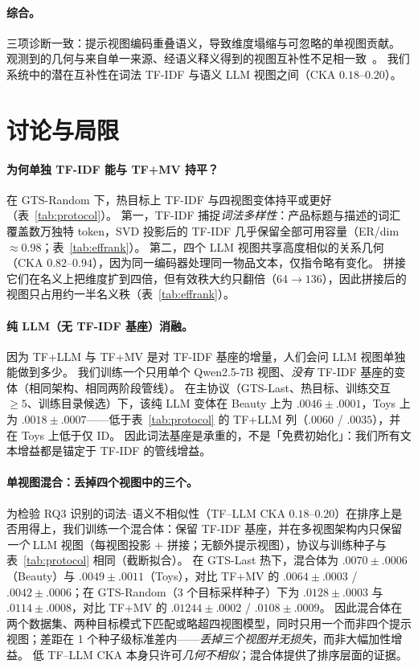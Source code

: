\documentclass[sigconf,natbib=true,anonymous]{acmart}
\newcommand{\tfidf}{\textsc{TF-IDF}\xspace}
\newcommand{\llm}{\textsc{LLM}\xspace}
\newcommand{\tfllm}{\textsc{TF+LLM}\xspace}
\newcommand{\tfmv}{\textsc{TF+MV}\xspace}
\begin{document}
\paragraph{综合。}
三项诊断一致：提示视图编码重叠语义，导致维度塌缩与可忽略的单视图贡献。
观测到的几何与来自单一来源、经语义释义得到的视图互补性不足相一致~\cite{xu2013multiview}。
我们系统中的潜在互补性在词法 \tfidf 与语义 \llm 视图之间（CKA $0.18$--$0.20$）。

\section{讨论与局限}
\label{sec:discussion}

\paragraph{为何单独 TF-IDF 能与 \tfmv 持平？}
在 GTS-Random 下，热目标上 \tfidf 与四视图变体持平或更好（表~\ref{tab:protocol}）。
第一，\tfidf 捕捉\emph{词法多样性}：产品标题与描述的词汇覆盖数万独特 token，SVD 投影后的 TF-IDF 几乎保留全部可用容量（ER/dim $\approx$0.98；表~\ref{tab:effrank}）。
第二，四个 LLM 视图共享高度相似的关系几何（CKA $0.82$--$0.94$），因为同一编码器处理同一物品文本，仅指令略有变化。
拼接它们在名义上把维度扩到四倍，但有效秩大约只翻倍（$64 \to 136$），因此拼接后的视图只占用约一半名义秩（表~\ref{tab:effrank}）。

\paragraph{纯 LLM（无 \tfidf 基座）消融。}
因为 \tfllm 与 \tfmv 是对 \tfidf 基座的增量，人们会问 LLM 视图单独能做到多少。
我们训练一个只用单个 Qwen2.5-7B 视图、\emph{没有} \tfidf 基座的变体（相同架构、相同两阶段管线）。
在主协议（GTS-Last、热目标、训练交互 $\ge 5$、训练目录候选）下，该纯 LLM 变体在 Beauty 上为 $.0046\pm.0001$，Toys 上为 $.0018\pm.0007$——低于表~\ref{tab:protocol} 的 \tfllm 列（$.0060$ / $.0035$），并在 Toys 上低于仅 ID。
因此词法基座是承重的，不是「免费初始化」：我们所有文本增益都是锚定于 \tfidf 的管线增益。

\paragraph{单视图混合：丢掉四个视图中的三个。}
为检验 RQ3 识别的词法--语义不相似性（TF--LLM CKA $0.18$--$0.20$）在排序上是否用得上，我们训练一个混合体：保留 \tfidf 基座，并在多视图架构内只保留\emph{一个} LLM 视图（每视图投影 + 拼接；无额外提示视图），协议与训练种子与表~\ref{tab:protocol} 相同（截断拟合）。
在 GTS-Last 热下，混合体为 $.0070\pm.0006$（Beauty）与 $.0049\pm.0011$（Toys），对比 \tfmv 的 $.0064\pm.0003$ / $.0042\pm.0006$；在 GTS-Random（3 个目标采样种子）下为 $.0128\pm.0003$ 与 $.0114\pm.0008$，对比 \tfmv 的 $.01244\pm.0002$ / $.0108\pm.0009$。
因此混合体在两个数据集、两种目标模式下匹配或略超四视图模型，同时只用一个而非四个提示视图；差距在 1 个种子级标准差内——\emph{丢掉三个视图并无损失}，而非大幅加性增益。
低 TF--LLM CKA 本身只许可\emph{几何不相似}；混合体提供了排序层面的证据。
\end{document}
